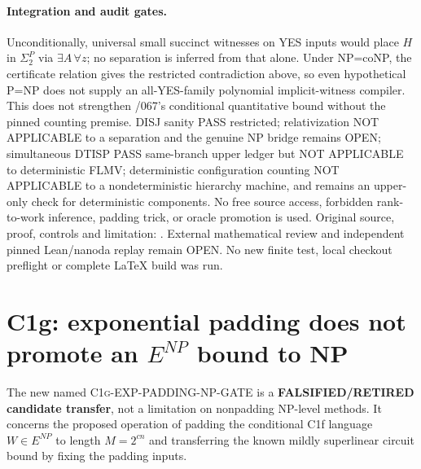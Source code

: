 \documentclass[11pt]{article}
\begin{document}
\paragraph{Integration and audit gates.}
Unconditionally, universal small succinct witnesses on
YES inputs would place $H$ in $\Sigma_2^P$ via
$\exists A\,\forall z$; no separation is inferred
from that alone. Under NP=coNP, the certificate
relation gives the restricted contradiction above,
so even hypothetical P=NP does not supply an
all-YES-family polynomial implicit-witness compiler.
This does not strengthen /067's conditional quantitative
bound without the pinned counting premise.
DISJ sanity PASS restricted; relativization NOT APPLICABLE
to a separation and the genuine NP bridge remains OPEN;
simultaneous DTISP PASS same-branch upper ledger but
NOT APPLICABLE to deterministic FLMV; deterministic
configuration counting NOT APPLICABLE to a nondeterministic
hierarchy machine, and remains an upper-only check for
deterministic components. No free source access, forbidden
rank-to-work inference, padding trick, or oracle promotion
is used. Original source, proof, controls and limitation:
.
External mathematical review and independent pinned
Lean/nanoda replay remain OPEN. No new finite test,
local checkout preflight or complete LaTeX build was run.

\section{C1g: exponential padding does not promote an $E^{NP}$ bound to NP}
The new named \textsc{C1g-EXP-PADDING-NP-GATE} is a
\textbf{FALSIFIED/RETIRED candidate transfer}, not a limitation on
nonpadding NP-level methods. It concerns the proposed operation of
padding the conditional C1f language $W\in E^{NP}$ to length
$M=2^{cn}$ and transferring the known mildly superlinear circuit
bound by fixing the padding inputs.
\end{document}
